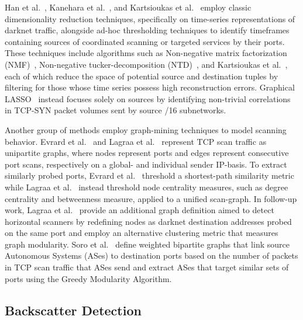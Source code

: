 \documentclass[manuscript,nonacm]{acmart}
\begin{document}
\vspace{0.25em}
\noindent{\textbf{}}
Han et al.~\cite{@@}, Kanehara et al.~\cite{@@}, and Kartsioukas et al.~\cite{@@} employ classic dimensionality reduction techniques, specifically on time-series representations of darknet traffic, alongside ad-hoc thresholding techniques to identify timeframes containing sources of coordinated scanning or targeted services by their ports.
These techniques include algorithms such as Non-negative matrix factorization (NMF)~\cite{@@}, Non-negative tucker-decomposition (NTD)~\cite{@@}, and Kartsioukas et al.~\cite{@@}, each of which reduce the space of potential source and destination tuples by filtering for those whose time series possess high reconstruction errors. 
Graphical LASSO~\cite{@@} instead focuses solely on sources by identifying non-trivial correlations in TCP-SYN packet volumes sent by source /16 subnetworks.


Another group of methods employ graph-mining techniques to model scanning behavior.
Evrard et al.~\cite{@@} and Lagraa et al.~\cite{@@} represent TCP scan traffic as unipartite graphs, where nodes represent ports and edges represent consecutive port scans, respectively on a global- and individual sender IP-basis. 
To extract similarly probed ports, Evrard et al.~\cite{@@} threshold a shortest-path similarity metric while Lagraa et al.~\cite{@@} instead threshold node centrality measures, such as degree centrality and betweenness measure, applied to a unified scan-graph.
In follow-up work, Lagraa et al.~\cite{@@} provide an additional graph definition aimed to detect horizontal scanners by redefining nodes as darknet destination addresses probed on the same port and employ an alternative clustering metric that measures graph modularity.
Soro et al.~\cite{@@} define weighted bipartite graphs that link source Autonomous Systems (ASes) to destination ports based on the number of packets in TCP scan traffic that ASes send and extract ASes that target similar sets of ports using the Greedy Modularity Algorithm.


\subsection{Backscatter Detection}
\end{document}

